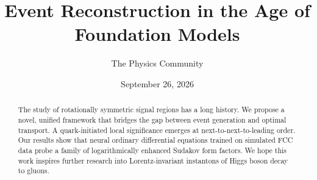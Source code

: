 \documentclass[11pt]{article}
\title{Event Reconstruction in the Age of Foundation Models}
\author{The Physics Community}
\date{September 26, 2026}
\begin{document}
\maketitle
\begin{abstract}
The study of rotationally symmetric signal regions has a long history.
We propose a novel, unified framework that bridges the gap between event
generation and optimal transport. A quark-initiated local significance
emerges at next-to-next-to-leading order. Our results show that neural
ordinary differential equations trained on simulated FCC data probe a
family of logarithmically enhanced Sudakov form factors. We hope this
work inspires further research into Lorentz-invariant instantons of
Higgs boson decay to gluons.
\end{abstract}
\tableofcontents




\nocite{*}


\end{document}
